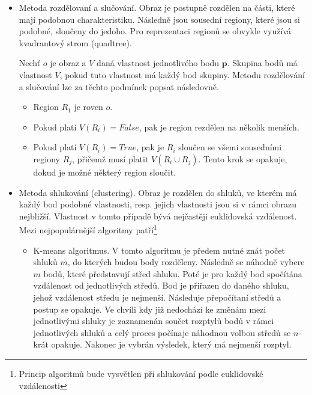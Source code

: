 \documentclass[twoside]{ctuthesis}
\newcommand{\tl}[1]{$\mathbf{#1}$}
\begin{document}
\begin{itemize}
\item Metoda rozdělovaní a slučování. Obraz je postupně rozdělen na části, které mají podobnou charakteristiku. Následně jsou sousední regiony, které jsou si podobné, sloučeny do jedoho. Pro reprezentaci regionů se obvykle využívá kvadrantový strom (quadtree).

    Nechť $o$ je obraz a $V$ daná vlastnost jednotlivého bodu \tl{p}. Skupina bodů má vlastnost $V$, pokud tuto vlastnost má každý bod skupiny. Metodu rozdělování a slučování lze za těchto podmínek popsat následovně.\cite{segmentace_metody}
    \begin{itemize}
        \item Region $R_1$ je roven $o$.
        \item Pokud platí $V(R_i) = False$, pak je region rezdělen na několik menších.
        \item Pokud platí $V(R_i) = True$, pak je $R_i$ sloučen se všemi sousedními regiony $R_j$, přičemž musí platit $V(R_i \cup R_j)$. Tento krok se opakuje, dokud je možné některý region sloučit.
    \end{itemize}         %
\item Metoda shlukování (clustering). Obraz je rozdělen do shluků, ve kterém má každý bod podobné vlastnosti, resp. jejich vlastnosti jsou si v rámci obrazu nejbližší. Vlastnost v tomto případě bývá nejčastěji euklidovská vzdálenost. Mezi nejpopulárnější algoritmy patří\footnote{Princip algoritmů bude vysvětlen při shlukování podle euklidovské vzdálenosti}
    \begin{itemize}
        \item K-means algoritmus. V tomto algoritmu je předem nutné znát počet shluků $m$, do kterých budou body rozděleny. Následně se náhodně vybere $m$ bodů, které představují střed shluku. Poté je pro každý bod spočítána vzdálenost od jednotlivých středů. Bod je přiřazen do daného shluku, jehož vzdálenost středu je nejmenší. Následuje přepočítaní středů a postup se opakuje. Ve chvíli kdy již nedochází ke změnám mezi jednotlivými shluky je zaznamenán součet rozptylů bodů v rámci jednotlivých shluků a celý proces počínaje náhodnou volbou středů se $n$-krát opakuje. Nakonec je vybrán výsledek, který má nejmenší rozptyl.

\end{itemize}
\end{itemize}
\end{document}

